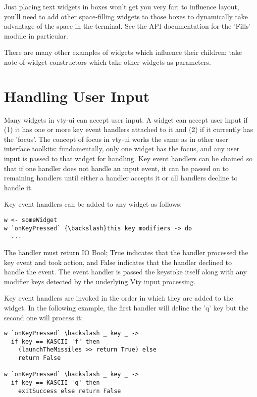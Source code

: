 \documentclass[11pt, letterpaper, oneside, titlepage]{article}
\begin{document}
Just placing text widgets in boxes won't get you very far; to influence
layout, you'll need to add other space-filling widgets to those boxes to
dynamically take advantage of the space in the terminal.  See the API
documentation for the 'Fills' module in particular.

There are many other examples of widgets which influence their children;
take note of widget constructors which take other widgets as parameters.

\section{Handling User Input}

Many widgets in vty-ui can accept user input.  A widget can accept user
input if (1) it has one or more key event handlers attached to it and
(2) if it currently has the 'focus'.  The concept of focus in vty-ui
works the same as in other user interface toolkits:  fundamentally, only
one widget has the focus, and any user input is passed to that widget
for handling.  Key event handlers can be chained so that if one handler
does not handle an input event, it can be passed on to remaining
handlers until either a handler accepts it or all handlers decline to
handle it.

Key event handlers can be added to any widget as follows:

\begin{verbatim}
w <- someWidget
w `onKeyPressed` {\backslash}this key modifiers -> do
  ...
\end{verbatim}

The handler must return IO Bool; True indicates that the handler
processed the key event and took action, and False indicates that the
handler declined to handle the event.  The event handler is passed the
keystoke itself along with any modifier keys detected by the underlying
Vty input processing.

Key event handlers are invoked in the order in which they are added to
the widget.  In the following example, the first handler will deline the
'q' key but the second one will process it:

\begin{verbatim}
w `onKeyPressed` \backslash _ key _ ->
  if key == KASCII 'f' then
    (launchTheMissiles >> return True) else
    return False

w `onKeyPressed` \backslash _ key _ ->
  if key == KASCII 'q' then
    exitSuccess else return False
\end{verbatim}
\end{document}
